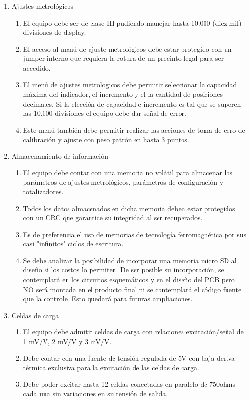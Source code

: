 \documentclass[11pt]{charter}
\begin{document}
\begin{enumerate}
\item Ajustes metrológicos
	\begin{enumerate}
	\item El equipo debe ser de clase III pudiendo manejar hasta 10.000 (diez mil) divisiones de display.
	\item El acceso al menú de ajuste metrológicos debe estar protegido con un jumper interno que requiera la rotura de un precinto legal para ser accedido. 
	\item El menú de ajustes metrologicos debe permitir seleccionar la capacidad máxima del indicador, el incremento y el la cantidad de posiciones decimales. Si la elección de capacidad e incremento es tal que se superen las 10.000 divisiones el equipo debe dar señal de error.
	\item Este menú también debe permitir realizar las acciones de toma de cero de calibración y ajuste con peso patrón en hasta 3 puntos.
	\end{enumerate}
\item Almacenamiento de información
	\begin{enumerate}
	\item El equipo debe contar con una memoria no volátil para almacenar los parámetros de ajustes metrológicos, parámetros de configuración y totalizadores. 
	\item Todos los datos almacenados en dicha memoria deben estar protegidos con un CRC que garantice su integridad al ser recuperados.
	\item Es de preferencia el uso de memorias de tecnología ferromagnética por sus casi "infinitos" ciclos de escritura. 
	\item Se debe analizar la posibilidad de incorporar una memoria micro SD al diseño si los costos lo permiten. De ser posible su incorporación, se contemplará en los circuitos esquemáticos y en el diseño del PCB pero NO será montada en el producto final ni se contemplará el código fuente que la controle. Esto quedará para futuras ampliaciones.
	\end{enumerate}	
\item Celdas de carga
	\begin{enumerate}
	\item El equipo debe admitir celdas de carga con relaciones excitación/señal de 1 mV/V, 2 mV/V y 3 mV/V.
	\item Debe contar con una fuente de tensión regulada de 5V con baja deriva térmica exclusiva para la excitación de las celdas de carga.
	\item Debe poder excitar hasta 12 celdas conectadas en paralelo de 750ohms cada una sin variaciones en su tensión de salida. 

\end{enumerate}
\end{enumerate}
\end{document}
